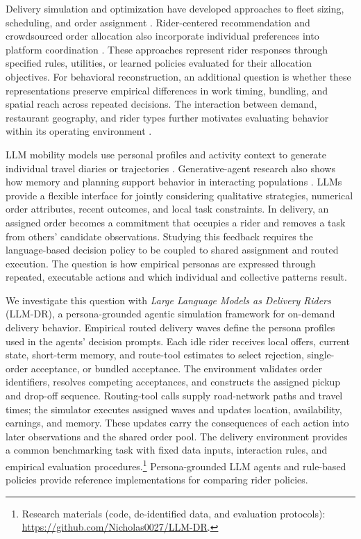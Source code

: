 \documentclass[letterpaper,journal]{IEEEtran}
\begin{document}
Delivery simulation and optimization have developed approaches to fleet sizing, scheduling, and order assignment \cite{sinhaSimulationbasedStudyDetermine2021,wangOnlineDeepReinforcement2023}. Rider-centered recommendation and crowdsourced order allocation also incorporate individual preferences into platform coordination \cite{wangOnlineDeepReinforcement2023,wangRecommendingGrabbing2023}. These approaches represent rider responses through specified rules, utilities, or learned policies evaluated for their allocation objectives. For behavioral reconstruction, an additional question is whether these representations preserve empirical differences in work timing, bundling, and spatial reach across repeated decisions. The interaction between demand, restaurant geography, and rider types further motivates evaluating behavior within its operating environment \cite{liRealtimeDemandsRestaurant2025}.

LLM mobility models use personal profiles and activity context to generate individual travel diaries or trajectories \cite{wangLargeLanguageModels2024,juTrajLLMModularLLMEnhanced2025,liBeMoreReal2024,shaoChainofPlannedBehaviourWorkflowElicits2024}. Generative-agent research also shows how memory and planning support behavior in interacting populations \cite{parkGenerativeAgentsInteractive2023}. LLMs provide a flexible interface for jointly considering qualitative strategies, numerical order attributes, recent outcomes, and local task constraints. In delivery, an assigned order becomes a commitment that occupies a rider and removes a task from others' candidate observations. Studying this feedback requires the language-based decision policy to be coupled to shared assignment and routed execution. The question is how empirical personas are expressed through repeated, executable actions and which individual and collective patterns result.

We investigate this question with \emph{Large Language Models as Delivery Riders} (LLM-DR), a persona-grounded agentic simulation framework for on-demand delivery behavior. Empirical routed delivery waves define the persona profiles used in the agents' decision prompts. Each idle rider receives local offers, current state, short-term memory, and route-tool estimates to select rejection, single-order acceptance, or bundled acceptance. The environment validates order identifiers, resolves competing acceptances, and constructs the assigned pickup and drop-off sequence. Routing-tool calls supply road-network paths and travel times; the simulator executes assigned waves and updates location, availability, earnings, and memory. These updates carry the consequences of each action into later observations and the shared order pool. The delivery environment provides a common benchmarking task with fixed data inputs, interaction rules, and empirical evaluation procedures.\footnote{Research materials (code, de-identified data, and evaluation protocols): \url{https://github.com/Nicholas0027/LLM-DR}.} Persona-grounded LLM agents and rule-based policies provide reference implementations for comparing rider policies.
\end{document}

